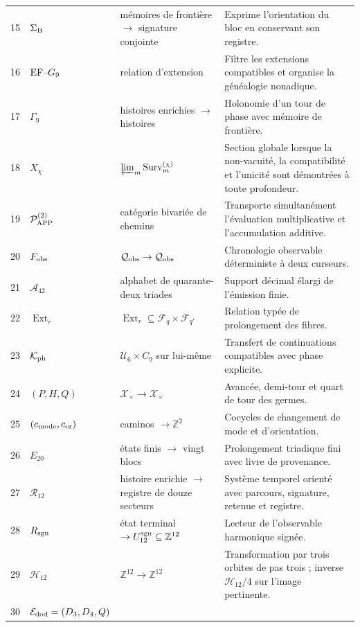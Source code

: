 \begin{longtable}{@{}r p{}p{}p{}@{}}
15&\(\Sigma_{\rm B}\)&mémoires de frontière \(\to\) signature conjointe&
Exprime l'orientation du bloc en conservant son registre.\\
16&\({\rm EF}\text{--}G_9\)&relation d’extension&
Filtre les extensions compatibles et organise la généalogie nonadique.\\
17&\(\Gamma_9\)&histoires enrichies \(\longrightarrow\) histoires&
Holonomie d’un tour de phase avec mémoire de frontière.\\
18&\(X_\chi\)&\(\varprojlim_m\operatorname{Surv}^{(\chi)}_m\)&
Section globale lorsque la non-vacuité, la compatibilité et l’unicité sont
démontrées à toute profondeur.\\
19&\(\mathcal P_{\rm APP}^{(2)}\)&catégorie bivariée de chemins&
Transporte simultanément l’évaluation multiplicative et l’accumulation
additive.\\
20&\(F_{\rm obs}\)&\(\mathcal Q_{\rm obs}\to\mathcal Q_{\rm obs}\)&
Chronologie observable déterministe à deux curseurs.\\
21&\(\mathcal A_{42}\)&alphabet de quarante-deux triades&
Support décimal élargi de l’émission finie.\\
22&\(\operatorname{Ext}_r\)&
\(\operatorname{Ext}_r\subseteq\mathcal F_q\times\mathcal F_{q'}\)&
Relation typée de prolongement des fibres.\\
23&\(\mathcal K_{\rm ph}\)&\(\mathcal U_6\times C_9\) sur lui-même&
Transfert de continuations compatibles avec phase explicite.\\
24&\((P,H,Q)\)&\(\mathcal X_\times\to\mathcal X_\times\)&
Avancée, demi-tour et quart de tour des germes.\\
25&\((c_{\rm mode},c_{\rm or})\)&caminos \(\to\mathbb Z^2\)&
Cocycles de changement de mode et d’orientation.\\
26&\(E_{20}\)&états finis \(\to\) vingt blocs&
Prolongement triadique fini avec livre de provenance.\\
27&\(\mathcal R_{12}\)&histoire enrichie \(\to\) registre de douze
secteurs&
Système temporel orienté avec parcours, signature, retenue et registre.\\
28&\(R_{\rm sgn}\)&état terminal \(\to U_{12}^{\rm sgn}
\subseteq\mathbb Z^{12}\)&
Lecteur de l’observable harmonique signée.\\
29&\(\mathcal H_{12}\)&\(\mathbb Z^{12}\to\mathbb Z^{12}\)&
Transformation par trois orbites de pas trois ; inverse
\(\mathcal H_{12}/4\) sur l’image pertinente.\\
30&\(\mathcal E_{\rm dod}=(D_3,D_4,Q)\)&

\end{longtable}

